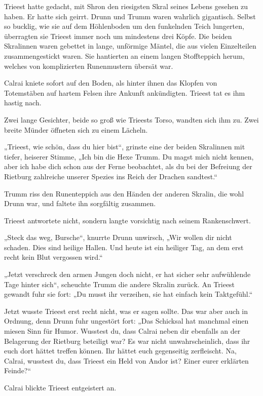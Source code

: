 Trieest hatte gedacht, mit Shron den riesigsten Skral seines Lebens gesehen zu haben. Er hatte sich geirrt. Drunn und Trumm waren wahrlich gigantisch. Selbst so bucklig, wie sie auf dem Höhlenboden um den funkelnden Teich lungerten, überragten sie Trieest immer noch um mindestens drei Köpfe. Die beiden Skralinnen waren gebettet in lange, unförmige Mäntel, die aus vielen Einzelteilen zusammengestickt waren. Sie hantierten an einem langen Stoffteppich herum, welches von komplizierten Runenmustern übersät war.

Calrai kniete sofort auf den Boden, als hinter ihnen das Klopfen von Totemstäben auf hartem Felsen ihre Ankunft ankündigten. Trieest tat es ihm hastig nach.

Zwei lange Gesichter, beide so groß wie Trieests Torso, wandten sich ihm zu. Zwei breite Münder öffneten sich zu einem Lächeln.

„Trieest, wie schön, dass du hier bist“, grinste eine der beiden Skralinnen mit tiefer, heiserer Stimme, „Ich bin die Hexe Trumm. Du magst mich nicht kennen, aber ich habe dich schon aus der Ferne beobachtet, als du bei der Befreiung der Rietburg zahlreiche unserer Spezies ins Reich der Drachen sandtest.“

Trumm riss den Runenteppich aus den Händen der anderen Skralin, die wohl Drunn war, und faltete ihn sorgfältig zusammen.

Trieest antwortete nicht, sondern langte vorsichtig nach seinem Rankenschwert.

„Steck das weg, Bursche“, knurrte Drunn unwirsch, „Wir wollen dir nicht schaden. Dies sind heilige Hallen. Und heute ist ein heiliger Tag, an dem erst recht kein Blut vergossen wird.“

„Jetzt verschreck den armen Jungen doch nicht, er hat sicher sehr aufwühlende Tage hinter sich“, scheuchte Trumm die andere Skralin zurück. An Trieest gewandt fuhr sie fort: „Du musst ihr verzeihen, sie hat einfach kein Taktgefühl.“

Jetzt wusste Trieest erst recht nicht, was er sagen sollte. Das war aber auch in Ordnung, denn Drunn fuhr ungestört fort: „Das Schicksal hat manchmal einen miesen Sinn für Humor. Wusstest du, dass Calrai neben dir ebenfalls an der Belagerung der Rietburg beteiligt war? Es war nicht unwahrscheinlich, dass ihr euch dort hättet treffen können. Ihr hättet euch gegenseitig zerfleischt. Na, Calrai, wusstest du, dass Trieest ein Held von Andor ist? Einer eurer erklärten Feinde?“

Calrai blickte Trieest entgeistert an.

